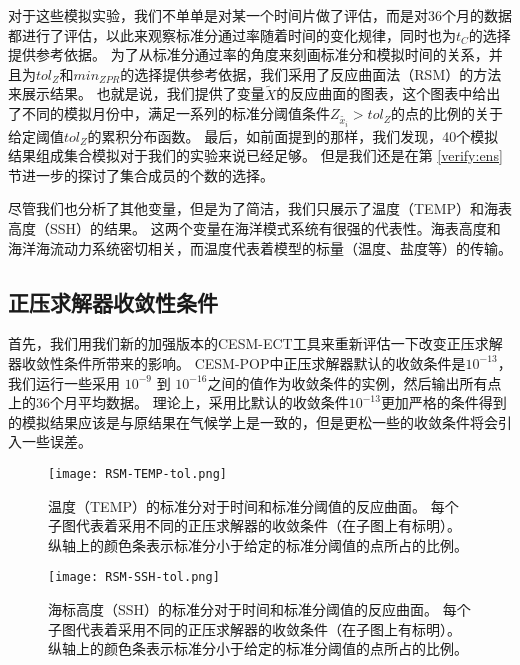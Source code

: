  对于这些模拟实验，我们不单单是对某一个时间片做了评估，而是对36个月的数据都进行了评估，以此来观察标准分通过率随着时间的变化规律，同时也为$t_C$的选择提供参考依据。
为了从标准分通过率的角度来刻画标准分和模拟时间的关系，并且为$tol_{Z}$和$min_{ZPR}$的选择提供参考依据，我们采用了反应曲面法（RSM）\cite{box2007}的方法来展示结果。 
也就是说，我们提供了变量$\tilde{X}$的反应曲面的图表，这个图表中给出了不同的模拟月份中，满足一系列的标准分阈值条件$Z_{\tilde{x_i}} > tol_{Z}$的点的比例的关于给定阈值$tol_{Z}$的累积分布函数。
最后，如前面提到的那样，我们发现，40个模拟结果组成集合模拟对于我们的实验来说已经足够。
但是我们还是在第 \ref{verify:ens}节进一步的探讨了集合成员的个数的选择。  

尽管我们也分析了其他变量，但是为了简洁，我们只展示了温度（TEMP）和海表高度（SSH）的结果。 
这两个变量在海洋模式系统有很强的代表性。海表高度和海洋海流动力系统密切相关，而温度代表着模型的标量（温度、盐度等）的传输。
 

\subsection{正压求解器收敛性条件}
\label{verify:ECT:baroSolver}

 
首先，我们用我们新的加强版本的CESM-ECT工具来重新评估一下改变正压求解器收敛性条件所带来的影响。
CESM-POP中正压求解器默认的收敛条件是$10^{-13}$， 我们运行一些采用 $10^{-9}$ 到 $10^{-16}$之间的值作为收敛条件的实例，然后输出所有点上的36个月平均数据。
理论上，采用比默认的收敛条件$10^{-13}$更加严格的条件得到的模拟结果应该是与原结果在气候学上是一致的，但是更松一些的收敛条件将会引入一些误差。


\begin {figure} 
\centering
\texttt{[image: RSM-TEMP-tol.png]}
\caption {温度（TEMP）的标准分对于时间和标准分阈值的反应曲面。 每个子图代表着采用不同的正压求解器的收敛条件（在子图上有标明）。纵轴上的颜色条表示标准分小于给定的标准分阈值的点所占的比例。}
\label{fig:RSM-TEMP-tol}
\end {figure}
 
\begin {figure} 
\centering
\texttt{[image: RSM-SSH-tol.png]}
\caption {海标高度（SSH）的标准分对于时间和标准分阈值的反应曲面。 每个子图代表着采用不同的正压求解器的收敛条件（在子图上有标明）。纵轴上的颜色条表示标准分小于给定的标准分阈值的点所占的比例。}
\label{fig:RSM-SSH-tol}
\end {figure}

